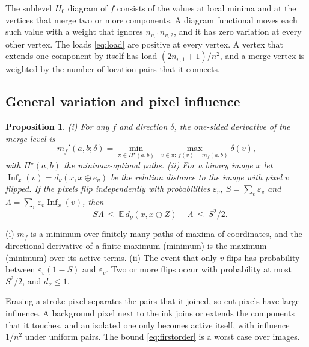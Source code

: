 \documentclass[10pt,conference]{IEEEtran}
\newtheorem{proposition}{Proposition}
\newcommand{\E}{\mathbb E}
\newcommand{\Inf}{\operatorname{Inf}}
\begin{document}
The sublevel $H_0$ diagram of $f$ consists of the values at local minima and at the vertices that merge two or more components. A diagram functional moves each such value with a weight that ignores $n_{v,1}n_{v,2}$, and it has zero variation at every other vertex. The loads \eqref{eq:load} are positive at every vertex. A vertex that extends one component by itself has load $(2n_{v,1}+1)/n^2$, and a merge vertex is weighted by the number of location pairs that it connects.

\subsection{General variation and pixel influence}
\begin{proposition}\label{prop:influence}
(i) For any $f$ and direction $\delta$, the one-sided derivative of the merge level is
\begin{equation}
 m_f'(a,b;\delta)=\min_{\pi\in\Pi^\star(a,b)}\ \max_{v\in\pi:\,f(v)=m_f(a,b)}\delta(v),
\end{equation}
with $\Pi^\star(a,b)$ the minimax-optimal paths. (ii) For a binary image $x$ let $\Inf_x(v)=d_\nu(x,x\oplus e_v)$ be the relation distance to the image with pixel $v$ flipped. If the pixels flip independently with probabilities $\varepsilon_v$, $S=\sum_v\varepsilon_v$ and $\Lambda=\sum_v\varepsilon_v\Inf_x(v)$, then
\begin{equation}
 -S\Lambda\ \le\ \E\,d_\nu(x,x\oplus Z)-\Lambda\ \le\ S^2/2 . \label{eq:firstorder}
\end{equation}
\end{proposition}
\begin{IEEEproof}
(i) $m_f$ is a minimum over finitely many paths of maxima of coordinates, and the directional derivative of a finite maximum (minimum) is the maximum (minimum) over its active terms. (ii) The event that only $v$ flips has probability between $\varepsilon_v(1-S)$ and $\varepsilon_v$. Two or more flips occur with probability at most $S^2/2$, and $d_\nu\le1$.
\end{IEEEproof}
Erasing a stroke pixel separates the pairs that it joined, so cut pixels have large influence. A background pixel next to the ink joins or extends the components that it touches, and an isolated one only becomes active itself, with influence $1/n^2$ under uniform pairs. The bound \eqref{eq:firstorder} is a worst case over images.
\end{document}

